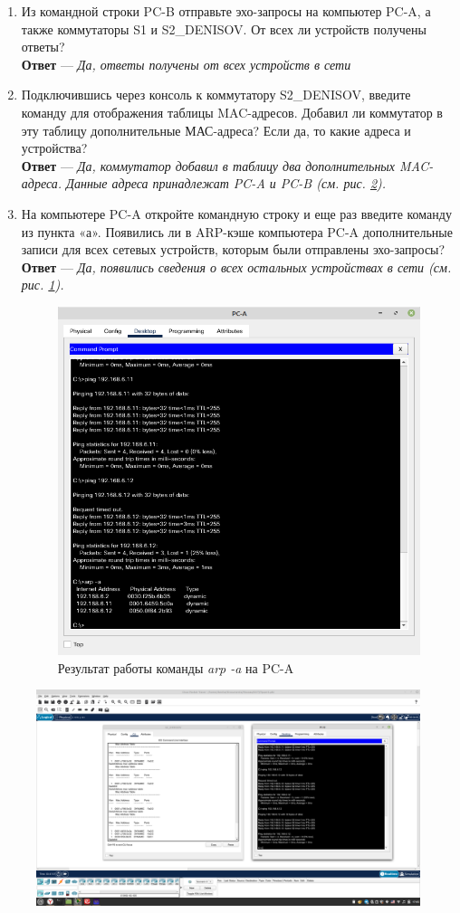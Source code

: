 \documentclass[a4paper,14pt]{extarticle}
\begin{document}
\begin{enumerate}
	\item Из командной строки PC-B отправьте эхо-запросы на компьютер PC-A, а также коммутаторы S1 и
	S2\_DENISOV. От всех ли устройств получены ответы?
	\\ \textbf{Ответ} --- \textit{Да, ответы получены от всех устройств в сети}
	\item Подключившись через консоль к коммутатору S2\_DENISOV, введите команду для отображения
	таблицы MAC-адресов. Добавил ли коммутатор в эту таблицу дополнительные МАС-адреса? Если
	да, то какие адреса и устройства?
	\\ \textbf{Ответ} --- \textit{Да, коммутатор добавил в таблицу два дополнительных MAC-адреса. Данные адреса принадлежат PC-A и PC-B (см. рис. \ref{fig:test-mac-b2}). }
	\item На компьютере PC-A откройте командную строку и еще раз введите команду из пункта «а».
	Появились ли в ARP-кэше компьютера PC-A дополнительные записи для всех сетевых устройств,
	которым были отправлены эхо-запросы?\\
	\textbf{Ответ} --- \textit{Да, появились сведения о всех остальных устройствах в сети (см. рис. \ref{fig:arp-pc-a}).}
		\begin{figure}
			\centering
			\includegraphics[width=0.5\linewidth]{images/arp-pc-a}
			\caption{Результат работы команды \textit{arp -a} на PC-A}
			\label{fig:arp-pc-a}
		\end{figure}
		
\end{enumerate}


\begin{figure}[h!]
	\centering
	\includegraphics[width=0.8\linewidth]{images/test-mac-b2}
	\caption{}
	\label{fig:test-mac-b2}
\end{figure}
\end{document}
